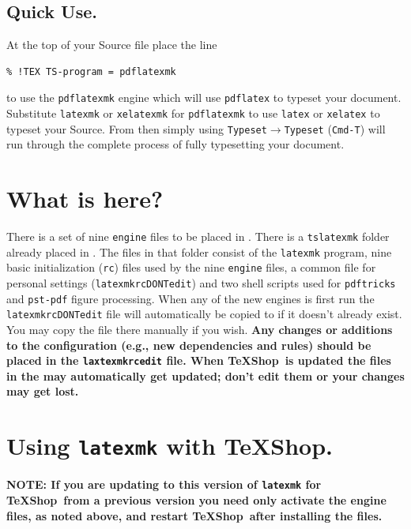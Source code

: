 \documentclass[11pt]{article}
\newcommand{\TS}{\textsf{\TeX Shop}}
\begin{document}
\subsection{Quick Use.}

At the top of your Source file place the line
\begin{verbatim}
% !TEX TS-program = pdflatexmk
\end{verbatim}
to use the \texttt{pdflatexmk} engine which will use \texttt{pdflatex} to typeset your document. Substitute \texttt{latexmk} or \texttt{xelatexmk} for \texttt{pdflatexmk} to use \texttt{latex} or \texttt{xelatex} to typeset your Source. From then simply using \texttt{Typeset}\(\to\)\texttt{Typeset} (\texttt{Cmd-T}) will run through the complete process of fully typesetting your document.

\section{What is here?}

There is a set of nine \texttt{engine} files to be placed in . There is a \texttt{tslatexmk} folder already placed in . The files in that folder consist of the \texttt{latexmk} program, nine basic initialization (\texttt{rc}) files used by the nine \texttt{engine} files, a common file for personal settings (\texttt{latexmkrcDONTedit}) and two shell scripts used for \texttt{pdftricks} and \texttt{pst-pdf} figure processing. When any of the new engines is first run the \texttt{latexmkrcDONTedit} file will automatically be copied to  if it doesn't already exist. You may copy the file there manually if you wish. \textbf{Any changes or additions to the configuration (e.g., new dependencies and rules) should be placed in the \texttt{laxtexmkrcedit} file. When \TS\ is updated the files in the  may automatically get updated; don't edit them or your changes may get lost.}

\section{Using \texttt{latexmk} with \TS.}

\textbf{NOTE: If you are updating to this version of \texttt{latexmk} for \TS\ from a previous version you need only activate the engine files, as noted above, and restart \TS\ after installing the files.
}
\end{document}
